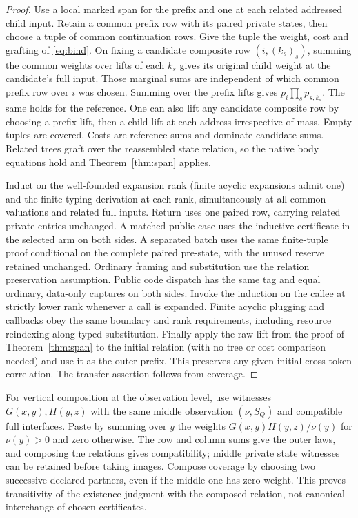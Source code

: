 \documentclass[11pt]{article}
\theoremstyle{definition}
\begin{document}
\begin{proof}
Use a local marked span for the prefix and one at each related
addressed child input. Retain a common prefix row with its paired
private states, then choose a tuple of common continuation rows. Give
the tuple the weight, cost and grafting of \eqref{eq:bind}. On fixing
a candidate composite row $(i,(k_s)_s)$, summing the common weights
over lifts of each $k_s$ gives its original child weight at the
candidate's full input. Those marginal sums are independent of which
common prefix row over $i$ was chosen. Summing over the prefix lifts
gives $p_i\prod_s p_{s,k_s}$. The same holds for the reference.
One can also lift any candidate composite row by choosing a prefix
lift, then a child lift at each address irrespective of mass. Empty
tuples are covered. Costs are reference sums and dominate candidate
sums. Related trees graft over the reassembled state relation, so the
native body equations hold and Theorem~\ref{thm:span} applies.

Induct on the well-founded expansion rank (finite acyclic expansions
admit one) and the finite typing derivation at each rank, simultaneously
at all common valuations and related full inputs. Return uses one paired
row, carrying related private entries unchanged. A matched public case uses the
inductive certificate in the selected arm on both sides. A separated
batch uses the same finite-tuple proof conditional on the complete
paired pre-state, with the unused reserve retained unchanged. Ordinary
framing and substitution use the relation preservation assumption.
Public code dispatch has the same tag and equal ordinary, data-only
captures on both sides. Invoke the induction on the callee at strictly
lower rank whenever a call is expanded. Finite acyclic plugging and
callbacks obey the same boundary and rank requirements, including
resource reindexing along typed substitution. Finally apply the raw lift from the proof of
Theorem~\ref{thm:span} to the initial relation (with no tree or cost
comparison needed) and use it as the outer prefix. This preserves any
given initial cross-token correlation. The transfer assertion follows
from coverage.
\end{proof}

For vertical composition at the observation level, use witnesses
$G(x,y),H(y,z)$ with the same middle observation $(\nu,S_Q)$ and compatible full
interfaces. Paste by summing over
$y$ the weights $G(x,y)H(y,z)/\nu(y)$ for $\nu(y)>0$ and zero
otherwise. The row and column sums give the outer laws, and
composing the relations gives compatibility; middle private state
witnesses can be retained before taking images. Compose coverage by
choosing two successive declared partners, even if the middle one
has zero weight. This proves transitivity of the existence judgment
with the composed relation, not canonical interchange of chosen
certificates.
\end{document}
